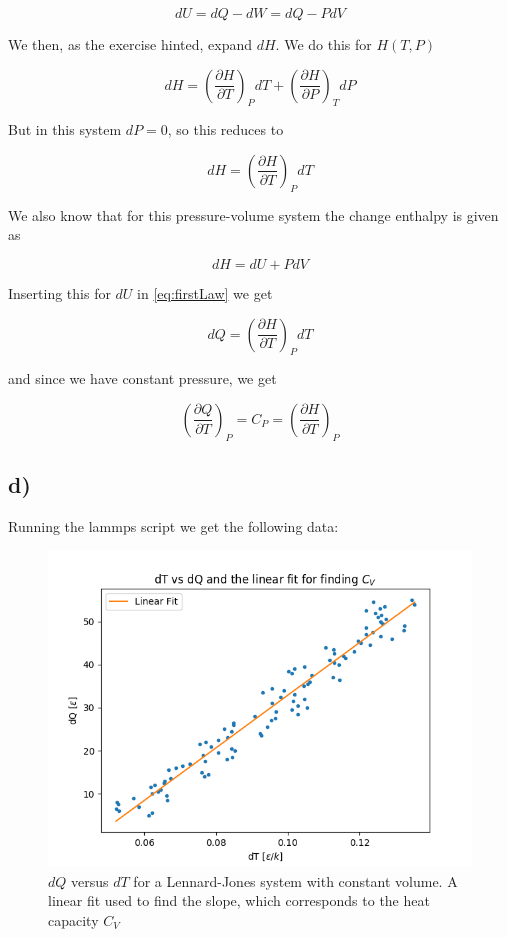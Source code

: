 \documentclass[a4paper,norsk, 10pt]{article}
\newcommand{\pd}[2]{\frac{\partial #1}{\partial #2}}
\begin{document}
\begin{equation}
dU = dQ - dW = dQ - PdV
\label{eq:firstLaw}
\end{equation}

We then, as the exercise hinted, expand $dH$. We do this for $H(T,P)$

\begin{equation}
dH = \left(\pd{H}{T}\right)_P dT + \left(\pd{H}{P}\right)_T dP
\end{equation}

But in this system $dP = 0$, so this reduces to

\begin{equation}
dH = \left(\pd{H}{T}\right)_P dT
\end{equation}

We also know that for this pressure-volume system the change enthalpy is given as

\begin{equation}
dH = dU + PdV
\end{equation}

Inserting this for $dU$ in \eqref{eq:firstLaw} we get

\begin{equation}
dQ = \left(\pd{H}{T}\right)_P dT
\end{equation}

and since we have constant pressure, we get

\begin{equation}
\left(\pd{Q}{T}\right)_P = C_P = \left(\pd{H}{T}\right)_P
\end{equation}

\subsection{d)}
Running the lammps script we get the following data:

\begin{figure}[H]
\centering
\includegraphics[scale=0.5]{dTdQ.png}
\caption{$dQ$ versus $dT$ for a Lennard-Jones system with constant volume. A linear fit used to find the slope, which corresponds to the heat capacity $C_V$}
\label{fig:isoTherm}
\end{figure}
\end{document}
